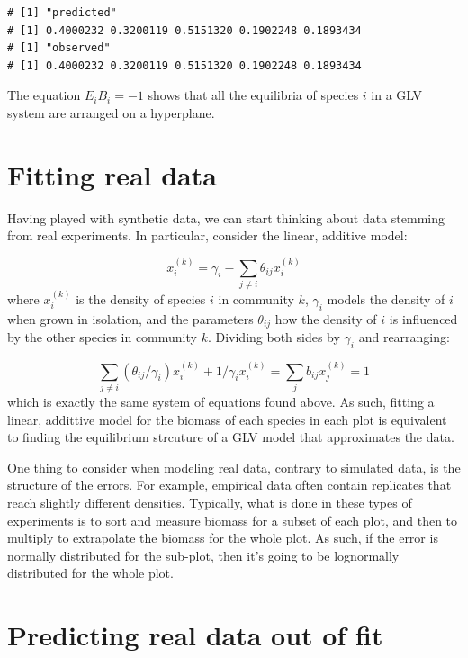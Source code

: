 \documentclass[]{book}
\begin{document}
\begin{verbatim}
# [1] "predicted"
# [1] 0.4000232 0.3200119 0.5151320 0.1902248 0.1893434
# [1] "observed"
# [1] 0.4000232 0.3200119 0.5151320 0.1902248 0.1893434
\end{verbatim}

The equation \(E_i B_i = -1\) shows that all the equilibria of species \(i\) in a GLV system are arranged on a hyperplane.

\hypertarget{fitting-real-data}{%
\section{Fitting real data}\label{fitting-real-data}}

Having played with synthetic data, we can start thinking about data stemming from real experiments. In particular, consider the linear, additive model:

\[
x_i^{(k)} = \gamma_i - \sum_{j\neq i} \theta_{ij} x_i^{(k)}
\]
where \(x_i^{(k)}\) is the density of species \(i\) in community \(k\), \(\gamma_i\) models the density of \(i\) when grown in isolation, and the parameters \(\theta_{ij}\) how the density of \(i\) is influenced by the other species in community \(k\). Dividing both sides by \(\gamma_i\) and rearranging:

\[
\sum_{j\neq i} (\theta_{ij} /\gamma_i) x_i^{(k)} + 1/{\gamma_i} x_i^{(k)}= \sum_j b_{ij} x_j^{(k)} = 1
\]
which is exactly the same system of equations found above. As such, fitting a linear, addittive model for the biomass of each species in each plot is equivalent to finding the equilibrium strcuture of a GLV model that approximates the data.

One thing to consider when modeling real data, contrary to simulated data, is the structure of the errors. For example, empirical data often contain replicates that reach slightly different densities. Typically, what is done in these types of experiments is to sort and measure biomass for a subset of each plot, and then to multiply to extrapolate the biomass for the whole plot. As such, if the error is normally distributed for the sub-plot, then it's going to be lognormally distributed for the whole plot.

\hypertarget{predicting-real-data-out-of-fit}{%
\section{Predicting real data out of fit}\label{predicting-real-data-out-of-fit}}


\end{document}
